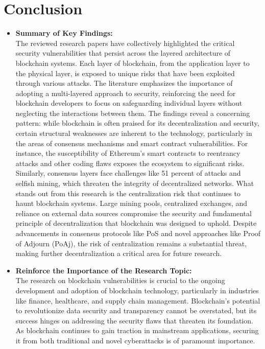 \documentclass[12pt,a4paper]{article}
\begin{document}
\section{Conclusion}
\begin{itemize}
    \item \textbf{Summary of Key Findings:} \\
The reviewed research papers have collectively highlighted the critical security vulnerabilities that persist across the layered architecture of blockchain systems. Each layer of blockchain, from the application layer to the physical layer, is exposed to unique risks that have been exploited through various attacks. The literature emphasizes the importance of adopting a multi-layered approach to security, reinforcing the need for blockchain developers to focus on safeguarding individual layers without neglecting the interactions between them.
The findings reveal a concerning pattern: while blockchain is often praised for its decentralization and security, certain structural weaknesses are inherent to the technology, particularly in the areas of consensus mechanisms and smart contract vulnerabilities. For instance, the susceptibility of Ethereum's smart contracts to reentrancy attacks and other coding flaws exposes the ecosystem to significant risks. Similarly, consensus layers face challenges like 51 percent of attacks and selfish mining, which threaten the integrity of decentralized networks.
What stands out from this research is the centralization risk that continues to haunt blockchain systems. Large mining pools, centralized exchanges, and reliance on external data sources compromise the security and fundamental principle of decentralization that blockchain was designed to uphold. Despite advancements in consensus protocols like PoS and novel approaches like Proof of Adjourn (PoAj), the risk of centralization remains a substantial threat, making further decentralization a critical area for future research.
    \item \textbf{Reinforce the Importance of the Research Topic:}
    \\
The research on blockchain vulnerabilities is crucial to the ongoing development and adoption of blockchain technology, particularly in industries like finance, healthcare, and supply chain management. Blockchain's potential to revolutionize data security and transparency cannot be overstated, but its success hinges on addressing the security flaws that threaten its foundation. As blockchain continues to gain traction in mainstream applications, securing it from both traditional and novel cyberattacks is of paramount importance.

\end{itemize}
\end{document}
